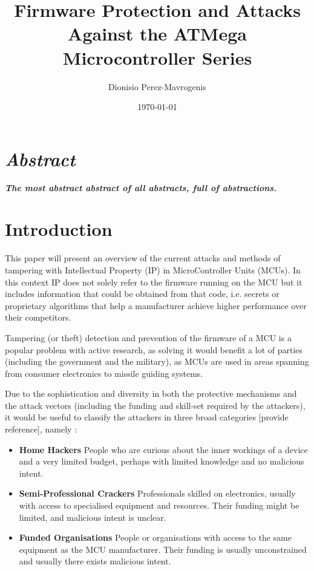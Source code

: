 \documentclass[12pt,a4paper,twocolumn]{article}
\author{Dionisio Perez-Mavrogenis}
\title{Firmware Protection and Attacks Against the ATMega Microcontroller Series}
\date{\today}
\begin{document}
	\maketitle
	
\section*{\emph{Abstract}}
	\textbf{\emph{The most abstract abstract of all abstracts, full of abstractions.}}
	

\section{Introduction}
	This paper will present an overview of the current attacks and methods of tampering with Intellectual Property (IP) in MicroController Units (MCUs). In this context IP does not solely refer to the firmware running on the MCU but it includes information that could be obtained from that code, i.e. secrets or proprietary algorithms that help a manufacturer achieve higher performance over their competitors.
	
	Tampering (or theft) detection and prevention of the firmware of a MCU is a popular problem with active research, as solving it would benefit a lot of parties (including the government and the military), as MCUs are used in areas spanning from consumer electronics to missile guiding systems.
	
	Due to the sophistication and diversity in both the protective mechanisms and the attack vectors (including the funding and skill-set required by the attackers), it would be useful to classify the attackers in three broad categories [provide reference], namely :
		\begin{itemize}
			\item \textbf{Home Hackers} People who are curious about the inner workings of a device and a very limited budget, perhaps with limited knowledge and no malicious intent.\\
			\item \textbf{Semi-Professional Crackers} Professionals skilled on electronics, usually with access to specialised equipment and resources. Their funding might be limited, and malicious intent is unclear.\\
			\item \textbf{Funded Organisations} People or organisations with access to the same equipment as the MCU manufacturer. Their funding is usually unconstrained and usually there exists malicious intent.
		\end{itemize}
	
\end{document}
